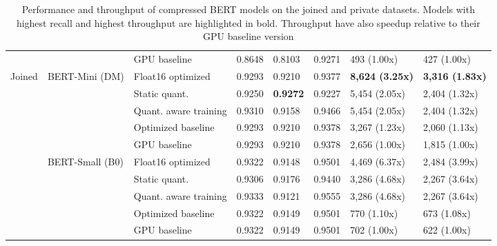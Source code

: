 \begin{table}[H]
{\begin{tabular}{
            >{\raggedright\arraybackslash}p{1.2cm}
            >{\raggedright\arraybackslash}p{3.3cm}
            llllll
            }
             &                             & GPU baseline          & 0.8648 & 0.8103          & 0.9271 & 493 (1.00x)            & 427 (1.00x)            \\
            \addlinespace
            Joined
             & BERT-Mini (DM)              & Float16 optimized     & 0.9293 & 0.9210          & 0.9377 & \textbf{8,624 (3.25x)} & \textbf{3,316 (1.83x)} \\
             &                             & Static quant.         & 0.9250 & \textbf{0.9272} & 0.9227 & 5,454 (2.05x)          & 2,404 (1.32x)          \\
             &                             & Quant. aware training & 0.9310 & 0.9158          & 0.9466 & 5,454 (2.05x)          & 2,404 (1.32x)          \\
             &                             & Optimized baseline    & 0.9293 & 0.9210          & 0.9378 & 3,267 (1.23x)          & 2,060 (1.13x)          \\
             &                             & GPU baseline          & 0.9293 & 0.9210          & 0.9378 & 2,656 (1.00x)          & 1,815 (1.00x)          \\
             & BERT-Small (B0)             & Float16 optimized     & 0.9322 & 0.9148          & 0.9501 & 4,469 (6.37x)          & 2,484 (3.99x)          \\
             &                             & Static quant.         & 0.9306 & 0.9176          & 0.9440 & 3,286 (4.68x)          & 2,267 (3.64x)          \\
             &                             & Quant. aware training & 0.9333 & 0.9121          & 0.9555 & 3,286 (4.68x)          & 2,267 (3.64x)          \\
             &                             & Optimized baseline    & 0.9322 & 0.9149          & 0.9501 & 770 (1.10x)            & 673 (1.08x)            \\
             &                             & GPU baseline          & 0.9322 & 0.9149          & 0.9501 & 702 (1.00x)            & 622 (1.00x)            \\
            \bottomrule
        \end{tabular}
    }
    \caption{Performance and throughput of compressed BERT models on the joined and private datasets. Models with highest recall and highest throughput are highlighted in bold. Throughput have also speedup relative to their GPU baseline version}
    \label{tab:compression_summary}
\end{table}

